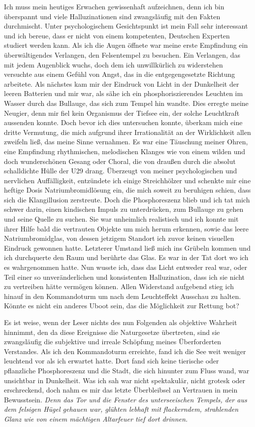 \documentclass[a4paper]{memoir}
\begin{document}
Ich muss mein heutiges Erwachen gewissenhaft aufzeichnen, denn ich bin überspannt und viele Halluzinationen sind zwangsläufig mit den Fakten durchmischt. Unter psychologischem Gesichtspunkt ist mein Fall sehr interessant und ich bereue, dass er nicht von einem kompetenten, Deutschen Experten studiert werden kann. Als ich die Augen öffnete war meine erste Empfindung ein überwältigendes Verlangen, den Felsentempel zu besuchen. Ein Verlangen, das mit jedem Augenblick wuchs, doch dem ich unwillkürlich zu widerstehen versuchte aus einem Gefühl von Angst, das in die entgegengesetzte Richtung arbeitete. Als nächstes kam mir der Eindruck von Licht in der Dunkelheit der leeren Batterien und mir war, als sähe ich ein phosphoriszierendes Leuchten im Wasser durch das Bullauge, das sich zum Tempel hin wandte. Dies erregte meine Neugier, denn mir fiel kein Organismus der Tiefsee ein, der solche Leuchtkraft aussenden konnte. Doch bevor ich dies untersuchen konnte, überkam mich eine dritte Vermutung, die mich aufgrund ihrer Irrationalität an der Wirklichkeit allen zweifeln ließ, das meine Sinne vernahmen. Es war eine Täuschung meiner Ohren, eine Empfindung rhythmischen, melodischen Klanges wie von einem wilden und doch wunderschönen Gesang oder Choral, die von draußen durch die absolut schalldichte Hülle der U29 drang. Überzeugt von meiner psychologischen und nervlichen Auffälligkeit, entzündete ich einige Streichhölzer und schenkte mir eine heftige Dosis Natriumbromidlösung ein, die mich soweit zu beruhigen schien, dass sich die Klangillusion zerstreute. Doch die Phosphoreszenz blieb und ich tat mich schwer darin, einen kindischen Impuls zu unterdrücken, zum Bullauge zu gehen und seine Quelle zu suchen. Sie war unheimlich realistisch und ich konnte mit ihrer Hilfe bald die vertrauten Objekte um mich herum erkennen, sowie das leere Natriumbromidglas, von dessen jetzigem Standort ich zuvor keinen visuellen Eindruck gewonnen hatte. Letzterer Umstand ließ mich ins Grübeln kommen und ich durchquerte den Raum und berührte das Glas. Es war in der Tat dort wo ich es wahrgenommen hatte. Nun wusste ich, dass das Licht entweder real war, oder Teil einer so unveränderlichen und konsistenten Halluzination, dass ich sie nicht zu vertreiben hätte vermögen können. Allen Widerstand aufgebend stieg ich hinauf in den Kommandoturm um nach dem Leuchteffekt Ausschau zu halten. Könnte es nicht ein anderes Uboot sein, das die Möglichkeit zur Rettung bot?

Es ist weise, wenn der Leser nichts des nun Folgenden als objektive Wahrheit hinnimmt, den da diese Ereignisse die Naturgesetze übertreten, sind sie zwangsläufig die subjektive und irreale Schöpfung meines Überforderten Verstandes. Als ich den Kommandoturm erreichte, fand ich die See weit weniger leuchtend vor als ich erwartet hatte. Dort fand sich keine tierische oder pflanzliche Phosphoreszenz und die Stadt, die sich hinunter  zum Fluss wand, war unsichtbar in Dunkelheit. Was ich sah war nicht spektakulär, nicht grotesk oder erschreckend, doch nahm es mir das letzte Überbleibsel an Vertrauen in mein Bewusstsein. \textit{Denn das Tor und die Fenster des unterseeischen Tempels, der aus dem felsigen Hügel gehauen war, glühten lebhaft mit flackerndem, strahlenden Glanz wie von einem mächtigen Altarfeuer tief dort drinnen.}
\end{document}

